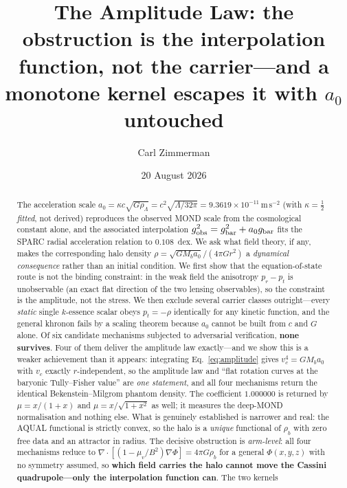 \documentclass[aps,prd,twocolumn,superscriptaddress,nofootinbib,floatfix]{revtex4-2}
\begin{document}
\title{The Amplitude Law: the obstruction is the interpolation function, not the
carrier---and a monotone kernel escapes it with $a_0$ untouched}

\author{Carl Zimmerman}

\date{20 August 2026}

\begin{abstract}
The acceleration scale $a_0 = \kappa c\sqrt{G\rho_\Lambda} = c^2\sqrt{\Lambda/32\pi}
= 9.3619\times10^{-11}\,\mathrm{m\,s^{-2}}$ (with $\kappa=\tfrac12$ \emph{fitted},
not derived) reproduces the observed MOND scale from the cosmological constant alone,
and the associated interpolation $g_{\rm obs}^2 = g_{\rm bar}^2 + a_0 g_{\rm bar}$
fits the SPARC radial acceleration relation to $0.108$~dex. We ask what field theory,
if any, makes the corresponding halo density
$\rho = \sqrt{G M_b a_0}/(4\pi G r^2)$ a \emph{dynamical consequence} rather than an
initial condition. We first show that the equation-of-state route is not the binding
constraint: in the weak field the anisotropy $p_r - p_t$ is unobservable (an exact flat
direction of the two lensing observables), so the constraint is the amplitude, not the
stress. We then exclude several carrier classes outright---every \emph{static} single
$k$-essence scalar obeys $p_t = -\rho$ identically for any kinetic function, and the
general khronon fails by a scaling theorem because $a_0$ cannot be built from $c$ and
$G$ alone. Of six candidate mechanisms subjected
to adversarial verification, \textbf{none survives}. Four of them deliver the amplitude
law exactly---and we show this is a weaker achievement than it appears: integrating
Eq.~\eqref{eq:amplitude} gives $v_c^4 = GM_ba_0$ with $v_c$ exactly $r$-independent, so
the amplitude law and ``flat rotation curves at the baryonic Tully--Fisher value'' are
\emph{one statement}, and all four mechanisms return the identical Bekenstein--Milgrom
phantom density. The coefficient $1.000000$ is returned by $\mu=x/(1+x)$ and
$\mu=x/\sqrt{1+x^2}$ as well; it measures the deep-MOND normalisation and nothing else.
What is genuinely established is narrower and real: the AQUAL functional is strictly
convex, so the halo is a \emph{unique} functional of $\rho_b$ with zero free data and an
attractor in radius. The decisive obstruction is \emph{arm-level}: all four mechanisms
reduce to $\nabla\!\cdot\![(1-\mu_v/B^2)\nabla\Phi] = 4\pi G\rho_b$ for a general
$\Phi(x,y,z)$ with no symmetry assumed, so \textbf{which field carries the halo cannot
move the Cassini quadrupole---only the interpolation function can}. The two kernels

\end{abstract}
\end{document}
